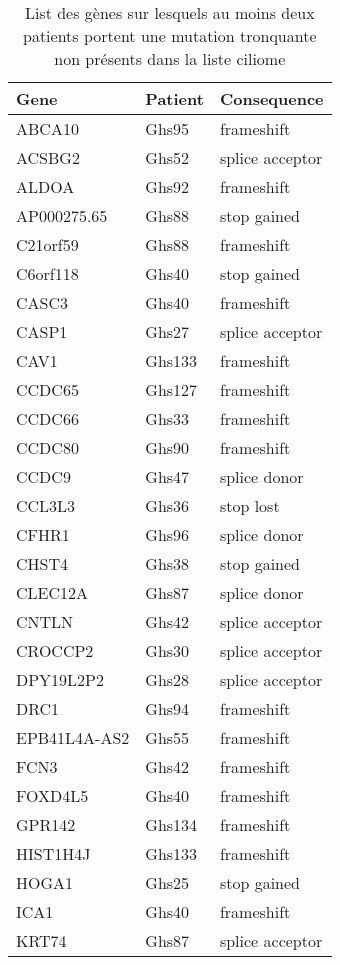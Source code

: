 \documentclass[12pt,twoside]{reedthesis}
\theoremstyle{definition}
\theoremstyle{definition}
\theoremstyle{remark}
\begin{document}
  \newpage
  
  \begin{longtable}[t]{lll}
  \caption{\label{tab:tabgrp3high}List des gènes sur lesquels au moins deux patients portent une mutation tronquante non présents dans la liste ciliome }\\
  \toprule
  Gene & Patient & Consequence\\
  \midrule
  ABCA10 & Ghs95 & frameshift\\
  ACSBG2 & Ghs52 & splice acceptor\\
  ALDOA & Ghs92 & frameshift\\
  AP000275.65 & Ghs88 & stop gained\\
  C21orf59 & Ghs88 & frameshift\\
  \addlinespace
  C6orf118 & Ghs40 & stop gained\\
  CASC3 & Ghs40 & frameshift\\
  CASP1 & Ghs27 & splice acceptor\\
  CAV1 & Ghs133 & frameshift\\
  CCDC65 & Ghs127 & frameshift\\
  \addlinespace
  CCDC66 & Ghs33 & frameshift\\
  CCDC80 & Ghs90 & frameshift\\
  CCDC9 & Ghs47 & splice donor\\
  CCL3L3 & Ghs36 & stop lost\\
  CFHR1 & Ghs96 & splice donor\\
  \addlinespace
  CHST4 & Ghs38 & stop gained\\
  CLEC12A & Ghs87 & splice donor\\
  CNTLN & Ghs42 & splice acceptor\\
  CROCCP2 & Ghs30 & splice acceptor\\
  DPY19L2P2 & Ghs28 & splice acceptor\\
  \addlinespace
  DRC1 & Ghs94 & frameshift\\
  EPB41L4A-AS2 & Ghs55 & frameshift\\
  FCN3 & Ghs42 & frameshift\\
  FOXD4L5 & Ghs40 & frameshift\\
  GPR142 & Ghs134 & frameshift\\
  \addlinespace
  HIST1H4J & Ghs133 & frameshift\\
  HOGA1 & Ghs25 & stop gained\\
  ICA1 & Ghs40 & frameshift\\
  KRT74 & Ghs87 & splice acceptor\\

\end{longtable}
\end{document}
